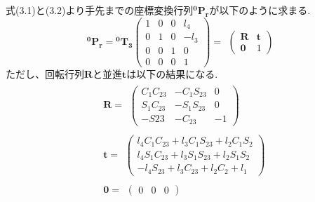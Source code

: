 	式(3.1)と(3.2)より手先までの座標変換行列$\boldsymbol{ ^{0}P_{r} }$が以下のように求まる.
	\begin{equation*}
		\boldsymbol{ ^{0}P_{r} } =
		\boldsymbol{^{0}T_{3}}
		\left(
		\begin{array}{cccc}
			1 & 0 & 0 & l_4\\
			0 & 1 & 0 & -l_3\\
			0 & 0 & 1 & 0\\
			0 & 0 & 0 & 1
		\end{array}
		\right)=
		\begin{array}{cc}
			\left(
				\begin{array}{cc}
					\boldsymbol{R} & \boldsymbol{t} \\
					\boldsymbol{0} & 1
				\end{array}
			\right)
		\end{array}
	\end{equation*}
	ただし、回転行列$\boldsymbol{R}$と並進$\boldsymbol{t}$は以下の結果になる.
	\begin{equation*}
	\begin{split}
		&\boldsymbol{R} =
		\begin{array}{cc}
			\left(
				\begin{array}{ccc}
					C_1C_{23} & -C_1S_{23} & 0 \\
					S_1C_{23} & -S_1S_{23} & 0 \\
					-S{23} & -C_{23} & -1
				\end{array}
			\right)
		\end{array} \\
		&\boldsymbol{t} =
		\begin{array}{cc}
			\left(
				\begin{array}{c}
					l_4C_1C_{23}+l_3C_1S_{23}+l_2C_1S_2 \\
					l_4S_1C_{23}+l_3S_1S_{23}+l_2S_1S_2 \\
				-l_4S_{23}+l_3C_{23}+l_2C_2+l_1
				\end{array}
			\right)
		\end{array}\\
		&\boldsymbol{0} =
		\begin{array}{cc}
			\left(
				\begin{array}{ccc}
					0 & 0 & 0
				\end{array}
			\right)
		\end{array}
	\end{split}
	\end{equation*}

